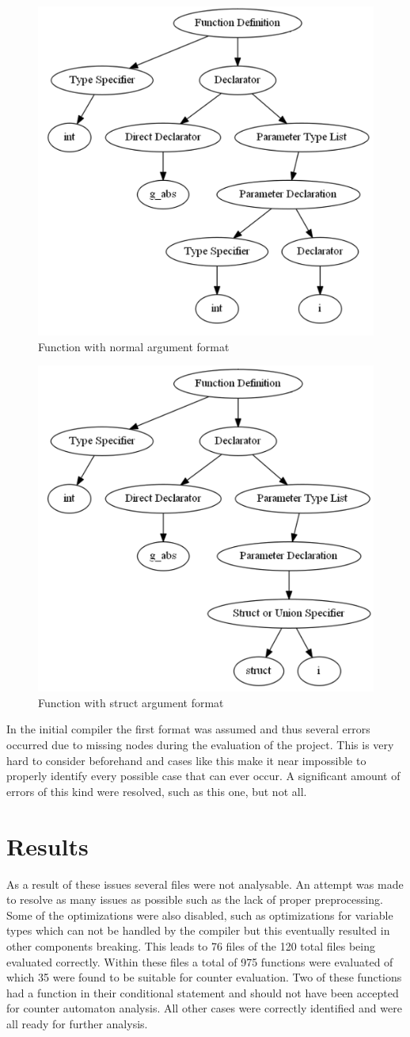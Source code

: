 \documentclass[12pt]{thesis}
\begin{document}
\begin{figure}[h]
	\centering
	\includegraphics[width=0.4\linewidth]{images/normal_function_param.png}
	\caption{Function with normal argument format}
	\label{fig:normal arguments}
\end{figure}


\begin{figure}[h]
	\centering
	\includegraphics[width=0.4\linewidth]{images/not_normal_function_param.png}
	\caption{Function with struct argument format}
	\label{fig:struct arguments}
\end{figure}

In the initial compiler the first format was assumed and thus several errors occurred due to missing nodes during the evaluation of the project. This is very hard to consider beforehand and cases like this make it near impossible to properly identify every possible case that can ever occur. A significant amount of errors of this kind were resolved, such as this one, but not all.

\section{Results}
As a result of these issues several files were not analysable. An attempt was made to resolve as many issues as possible such as the lack of proper preprocessing. Some of the optimizations were also disabled, such as optimizations for variable types which can not be handled by the compiler but this eventually resulted in other components breaking. This leads to 76 files of the 120 total files being evaluated correctly. Within these files a total of 975 functions were evaluated of which 35 were found to be suitable for counter evaluation. Two of these functions had a function in their conditional statement and should not have been accepted for counter automaton analysis. All other cases were correctly identified and were all ready for further analysis.
\end{document}
